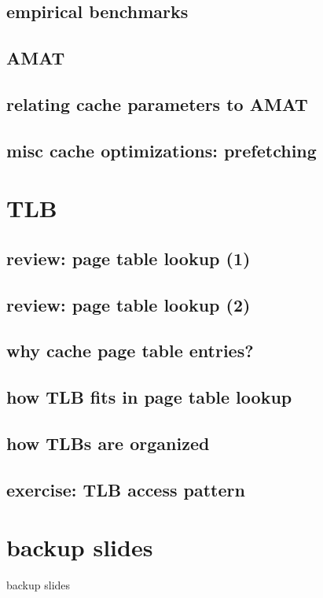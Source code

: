 \subsection{empirical benchmarks}


\subsection{AMAT}




\subsection{relating cache parameters to AMAT}



\subsection{misc cache optimizations: prefetching}


\section{TLB}

\subsection{review: page table lookup (1)}


\subsection{review: page table lookup (2)}

\subsection{why cache page table entries?}


\subsection{how TLB fits in page table lookup}


\subsection{how TLBs are organized}

\subsection{exercise: TLB access pattern}





\section{backup slides}
\begin{frame}{backup slides}
\end{frame}


